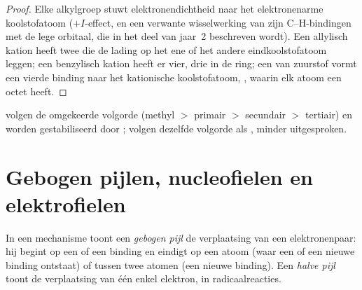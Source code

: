\begin{proof}
Elke alkylgroep stuwt elektronendichtheid naar het elektronenarme
koolstofatoom ($+I$-effect, en een verwante wisselwerking van zijn
C--H-bindingen met de lege orbitaal, die in het deel van jaar~2 beschreven
wordt). Een allylisch kation heeft twee  die de
lading op het ene of het andere eindkoolstofatoom leggen; een
benzylisch kation heeft er vier, drie in de ring; een  van
zuurstof vormt een vierde binding naar het kationische koolstofatoom,
, waarin elk atoom een octet heeft.
\end{proof}

 volgen de omgekeerde volgorde (methyl $>$ primair $>$
secundair $>$ tertiair) en worden gestabiliseerd door ;
 volgen dezelfde volgorde als , minder uitgesproken.

\section{Gebogen pijlen, nucleofielen en elektrofielen}

\begin{definition}\label{def:b1:electronic-effects:curly-arrow}
In een mechanisme toont een \emph{gebogen pijl} de
verplaatsing van een elektronenpaar: hij begint op een  of een
binding en eindigt op een atoom (waar een  of een nieuwe binding
ontstaat) of tussen twee atomen (een nieuwe binding). Een \emph{halve
pijl} toont de verplaatsing van één enkel elektron, in
radicaalreacties.
\end{definition}

